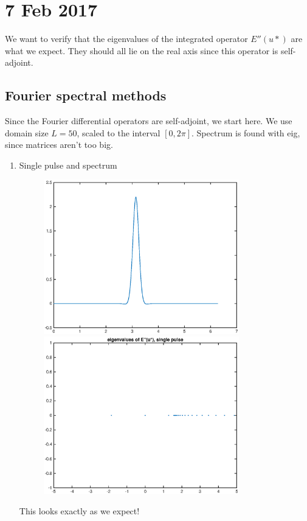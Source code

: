 \documentclass[12pt]{article}
\begin{document}
\section*{7 Feb 2017}
We want to verify that the eigenvalues of the integrated operator $E''(u*)$ are what we expect. They should all lie on the real axis since this operator is self-adjoint.\\

\subsection*{Fourier spectral methods}
Since the Fourier differential operators are self-adjoint, we start here. We use domain size $L = 50$, scaled to the interval $[0, 2 \pi]$. Spectrum is found with eig, since matrices aren't too big.
\begin{enumerate}
	\item Single pulse and spectrum
	\begin{figure}[H]
	\includegraphics[width=8.5cm]{fouriersinglepulse.eps}
	\includegraphics[width=8.5cm]{intEigs1.eps}
	\end{figure}
	This looks exactly as we expect!


\end{enumerate}
\end{document}
